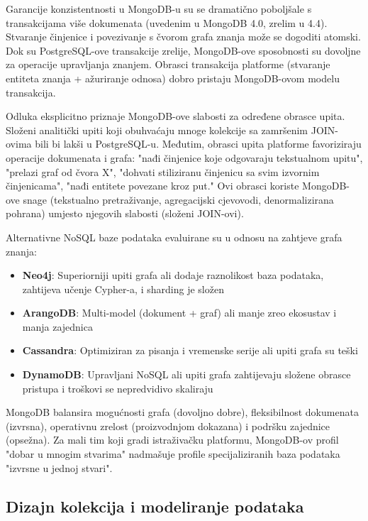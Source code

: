 \documentclass[12pt,a4paper]{article}
\begin{document}
Garancije konzistentnosti u MongoDB-u su se dramatično poboljšale s transakcijama više dokumenata (uvedenim u MongoDB 4.0, zrelim u 4.4). Stvaranje činjenice i povezivanje s čvorom grafa znanja može se dogoditi atomski. Dok su PostgreSQL-ove transakcije zrelije, MongoDB-ove sposobnosti su dovoljne za operacije upravljanja znanjem. Obrasci transakcija platforme (stvaranje entiteta znanja + ažuriranje odnosa) dobro pristaju MongoDB-ovom modelu transakcija.

Odluka eksplicitno priznaje MongoDB-ove slabosti za određene obrasce upita. Složeni analitički upiti koji obuhvaćaju mnoge kolekcije sa zamršenim JOIN-ovima bili bi lakši u PostgreSQL-u. Međutim, obrasci upita platforme favoriziraju operacije dokumenata i grafa: "nađi činjenice koje odgovaraju tekstualnom upitu", "prelazi graf od čvora X", "dohvati stiliziranu činjenicu sa svim izvornim činjenicama", "nađi entitete povezane kroz put." Ovi obrasci koriste MongoDB-ove snage (tekstualno pretraživanje, agregacijski cjevovodi, denormalizirana pohrana) umjesto njegovih slabosti (složeni JOIN-ovi).

Alternativne NoSQL baze podataka evaluirane su u odnosu na zahtjeve grafa znanja:
\begin{itemize}[leftmargin=*]
\item \textbf{Neo4j}: Superiorniji upiti grafa ali dodaje raznolikost baza podataka, zahtijeva učenje Cypher-a, i sharding je složen
\item \textbf{ArangoDB}: Multi-model (dokument + graf) ali manje zreo ekosustav i manja zajednica
\item \textbf{Cassandra}: Optimiziran za pisanja i vremenske serije ali upiti grafa su teški
\item \textbf{DynamoDB}: Upravljani NoSQL ali upiti grafa zahtijevaju složene obrasce pristupa i troškovi se nepredvidivo skaliraju
\end{itemize}

MongoDB balansira mogućnosti grafa (dovoljno dobre), fleksibilnost dokumenata (izvrsna), operativnu zrelost (proizvodnjom dokazana) i podršku zajednice (opsežna). Za mali tim koji gradi istraživačku platformu, MongoDB-ov profil "dobar u mnogim stvarima" nadmašuje profile specijaliziranih baza podataka "izvrsne u jednoj stvari".

\subsection{Dizajn kolekcija i modeliranje podataka}
\end{document}
